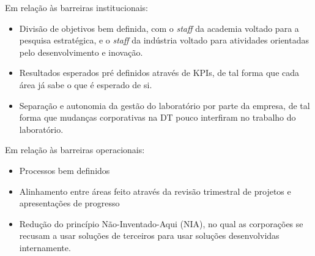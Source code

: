 Em relação às barreiras institucionais:
\begin{itemize}
\item Divisão de objetivos bem definida, com o \textit{staff} da academia voltado para a pesquisa estratégica, e o \textit{staff} da indústria voltado para atividades orientadas pelo desenvolvimento e inovação.
\item Resultados esperados pré definidos através de KPIs, de tal forma que cada área já sabe o que é esperado de si.
\item Separação e autonomia da gestão do laboratório por parte da empresa, de tal forma que mudanças corporativas na DT pouco interfiram no trabalho do laboratório.
\end{itemize}

Em relação às barreiras operacionais:
\begin{itemize}
\item Processos bem definidos 
\item Alinhamento entre áreas feito através da revisão trimestral de projetos e apresentações de progresso
\item Redução do princípio Não-Inventado-Aqui (NIA), no qual as corporações se recusam a usar soluções de terceiros para usar soluções desenvolvidas internamente.
\end{itemize}

